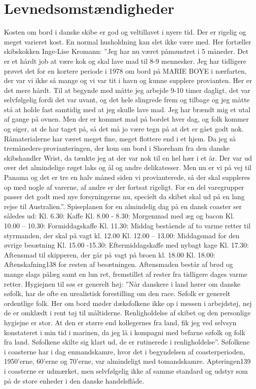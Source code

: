 \chapter{Levnedsomstændigheder}\label{levnedsomstuxe6ndigheder}

Kosten om bord i danske skibe er god og veltillavet i nyere tid. Der er
rigelig og meget varieret kost. En normal husholdning kan slet ikke være
med. Her fortæller skibskokken Inge-Lise Kromann: ''Jeg har nu været
påmønstret i 5 måneder. Det er et hårdt job at være kok og skal lave mad
til 8-9 mennesker. Jeg har tidligere prøvet det for en kortere periode i
1978 om bord på MARIE BOYE i nærfarten, der var vi ikke så mange og vi
var tit i havn og kunne supplere provianten. Her er det mere hårdt. Til
at begynde med måtte jeg arbejde 9-10 timer dagligt, det var
selvfølgelig fordi det var uvant, og det hele slingrede frem og tilbage
og jeg måtte stå at holde fast samtidig med at jeg skulle lave mad. Jeg
har brændt mig et utal af gange på ovnen. Men der er kommet mad på
bordet hver dag, og folk kommer og siger, at de har taget på, så det må
jo være tegn på at det er gået godt nok. Råmaterialerne har været meget
fine, meget flottere end i et hjem. Da jeg så
tremåneders-provianteringen, der kom om bord i Shoreham fra den danske
skibshandler Wrist, da tænkte jeg at der var nok til en hel hær i et år.
Der var ud over det almindelige røget laks og ål og andre delikatesser.
Men nu er vi på vej til Panama og det er tre en halv måned siden vi
provianterede, så der skal suppleres op med nogle af varerne, af andre
er der fortsat rigeligt. For en del varegrupper passer det godt med nye
forsyningerne nu, specielt da skibet skal ud på en lang rejse til
Australien.''. Spiseplanen for en almindelig dag på en dansk coaster ser
således ud: Kl. 6.30: Kaffe Kl. 8.00 - 8.30: Morgenmad med æg og bacon
Kl. 10.00 -- 10.30: Formiddagskaffe Kl. 11.30: Middag bestående af to
varme retter til styrmanden, der skal på vagt kl. 12.00 Kl. 12.00 --
13.00: Middagsmad for den øvrige besætning Kl. 15.00 -15.30:
Eftermiddagskaffe med nybagt kage Kl. 17.30: Aftensmad til skipperen,
der går på vagt på broen kl. 18.00 Kl. 18.00: Aftenskafning138 for
resten af besætningen. Aftensmaden består af brød og mange slags pålæg
samt en lun ret, fremstillet af rester fra tidligere dages varme retter.
Hygiejnen til søs er generelt høj: ''Når danskere i land hører om danske
søfolk, har de ofte en urealistisk forestilling om den race. Søfolk er
generelt ordentlige folk. Her om bord møder dæksfolkene ikke op i messen
i arbejdstøj, nej de er omklædt i rent tøj til måltiderne.
Renligholdelse af skibet og den personlige hygiejne er stor. At den er
større end kollegernes fra land, fik jeg ved selvsyn konstateret i min
tid i marinen, da jeg lå i kompagni med befarne søfolk og folk fra land.
Søfolkene skilte sig klart ud, de er rutinerede i renligholdelse''.
Søfolkene i coasterne har i dag enmandskamre, hvor det i begyndelsen af
coasterperioden, 1950'erne, 60'erne og 70'erne, var almindeligt med
tomandskamre. Apteringen139 i coasterne er udmærket, men selvfølgelig
ikke af samme standard og udstyr som på de store enheder i den danske
handelsflåde.

